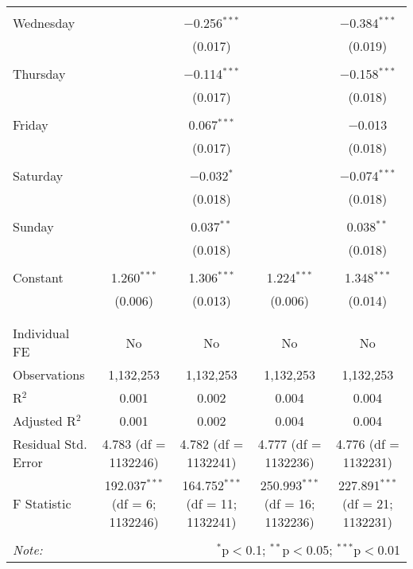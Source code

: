 \documentclass[
]{article}
\begin{document}
\begin{table}[!htbp]
{\begin{tabular}{@{\extracolsep{5pt}}lcccc}
  & & & & \\ 
 Wednesday &  & $-$0.256$^{***}$ &  & $-$0.384$^{***}$ \\ 
  &  & (0.017) &  & (0.019) \\ 
  & & & & \\ 
 Thursday &  & $-$0.114$^{***}$ &  & $-$0.158$^{***}$ \\ 
  &  & (0.017) &  & (0.018) \\ 
  & & & & \\ 
 Friday &  & 0.067$^{***}$ &  & $-$0.013 \\ 
  &  & (0.017) &  & (0.018) \\ 
  & & & & \\ 
 Saturday &  & $-$0.032$^{*}$ &  & $-$0.074$^{***}$ \\ 
  &  & (0.018) &  & (0.018) \\ 
  & & & & \\ 
 Sunday &  & 0.037$^{**}$ &  & 0.038$^{**}$ \\ 
  &  & (0.018) &  & (0.018) \\ 
  & & & & \\ 
 Constant & 1.260$^{***}$ & 1.306$^{***}$ & 1.224$^{***}$ & 1.348$^{***}$ \\ 
  & (0.006) & (0.013) & (0.006) & (0.014) \\ 
  & & & & \\ 
\hline \\[-1.8ex] 
Individual FE & No & No & No & No \\ 
Observations & 1,132,253 & 1,132,253 & 1,132,253 & 1,132,253 \\ 
R$^{2}$ & 0.001 & 0.002 & 0.004 & 0.004 \\ 
Adjusted R$^{2}$ & 0.001 & 0.002 & 0.004 & 0.004 \\ 
Residual Std. Error & 4.783 (df = 1132246) & 4.782 (df = 1132241) & 4.777 (df = 1132236) & 4.776 (df = 1132231) \\ 
F Statistic & 192.037$^{***}$ (df = 6; 1132246) & 164.752$^{***}$ (df = 11; 1132241) & 250.993$^{***}$ (df = 16; 1132236) & 227.891$^{***}$ (df = 21; 1132231) \\ 
\hline 
\hline \\[-1.8ex] 
\textit{Note:}  & \multicolumn{4}{r}{$^{*}$p$<$0.1; $^{**}$p$<$0.05; $^{***}$p$<$0.01} \\ 
\end{tabular}
} 
\end{table} 
\newpage
\end{document}
